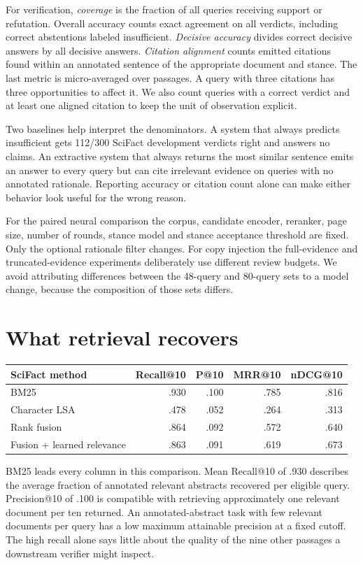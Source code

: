 For verification, \emph{coverage} is the fraction of all queries receiving support or refutation. Overall accuracy counts exact agreement on all verdicts, including correct abstentions labeled insufficient. \emph{Decisive accuracy} divides correct decisive answers by all decisive answers. \emph{Citation alignment} counts emitted citations found within an annotated sentence of the appropriate document and stance. The last metric is micro-averaged over passages. A query with three citations has three opportunities to affect it. We also count queries with a correct verdict and at least one aligned citation to keep the unit of observation explicit.

Two baselines help interpret the denominators. A system that always predicts insufficient gets 112/300 SciFact development verdicts right and answers no claims. An extractive system that always returns the most similar sentence emits an answer to every query but can cite irrelevant evidence on queries with no annotated rationale. Reporting accuracy or citation count alone can make either behavior look useful for the wrong reason.

For the paired neural comparison the corpus, candidate encoder, reranker, page size, number of rounds, stance model and stance acceptance threshold are fixed. Only the optional rationale filter changes. For copy injection the full-evidence and truncated-evidence experiments deliberately use different review budgets. We avoid attributing differences between the 48-query and 80-query sets to a model change, because the composition of those sets differs.

\section{What retrieval recovers}
\begin{center}\small
\begin{tabular}{@{}lrrrr@{}}\toprule
SciFact method & Recall@10 & P@10 & MRR@10 & nDCG@10\\\midrule
BM25 & .930 & .100 & .785 & .816\\
Character LSA & .478 & .052 & .264 & .313\\
Rank fusion & .864 & .092 & .572 & .640\\
Fusion + learned relevance & .863 & .091 & .619 & .673\\\bottomrule
\end{tabular}
\end{center}
BM25 leads every column in this comparison. Mean Recall@10 of .930 describes the average fraction of annotated relevant abstracts recovered per eligible query. Precision@10 of .100 is compatible with retrieving approximately one relevant document per ten returned. An annotated-abstract task with few relevant documents per query has a low maximum attainable precision at a fixed cutoff. The high recall alone says little about the quality of the nine other passages a downstream verifier might inspect.

